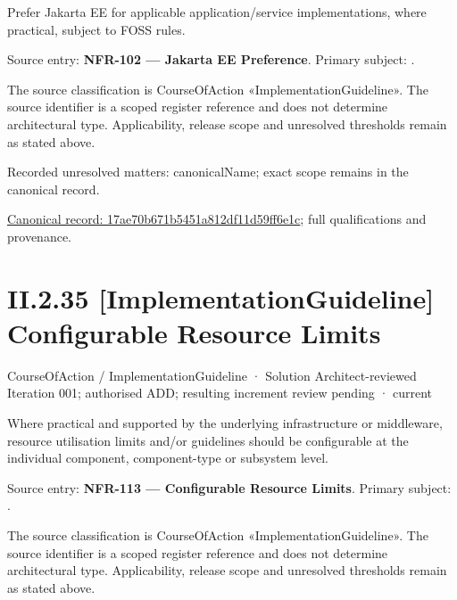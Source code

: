 Prefer Jakarta EE for applicable application/service implementations, where practical, subject to FOSS rules.



Source entry: \textbf{NFR-102 — Jakarta EE Preference}. Primary subject: \texttt{}.



The source classification is CourseOfAction «ImplementationGuideline». The source identifier is a scoped register reference and does not determine architectural type. Applicability, release scope and unresolved thresholds remain as stated above.


{\small Recorded unresolved matters: canonicalName; exact scope remains in the canonical record.}\par
{\footnotesize \href{../../../../../../../continuum/strategy/course-of-action/implementation-guideline/17ae70b671b5451a812df11d59ff6e1c.md}{Canonical record: 17ae70b671b5451a812df11d59ff6e1c}; full qualifications and provenance.}\par
\section*{II.2.35 [ImplementationGuideline] Configurable Resource Limits}
\label{navigation:II.2.35}

\label{element:4621a5cb0dbe445488439ac03398a8b5}
{\small CourseOfAction / ImplementationGuideline · Solution Architect-reviewed Iteration 001; authorised ADD; resulting increment review pending · current}\par

Where practical and supported by the underlying infrastructure or middleware, resource utilisation limits and/or guidelines should be configurable at the individual component, component-type or subsystem level.



Source entry: \textbf{NFR-113 — Configurable Resource Limits}. Primary subject: \texttt{}.



The source classification is CourseOfAction «ImplementationGuideline». The source identifier is a scoped register reference and does not determine architectural type. Applicability, release scope and unresolved thresholds remain as stated above.


